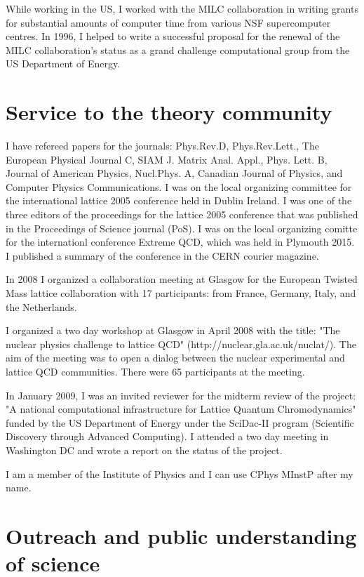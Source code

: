 \documentclass[12pt]{article}
\begin{document}
While working in the US,
I worked with the MILC collaboration in writing grants for
substantial amounts of computer time from various NSF supercomputer
centres. In 1996, I helped to write a successful proposal for the
renewal of the MILC collaboration's status as a grand challenge
computational group from the US Department of Energy. 


\section{Service to the theory community}

I have refereed papers for the journals: Phys.Rev.D, Phys.Rev.Lett.,
The European Physical Journal C, SIAM J. Matrix Anal. Appl.,
Phys. Lett. B, Journal of American Physics, Nucl.Phys. A, 
Canadian Journal of Physics,
and 
Computer Physics Communications.
I was on the local
organizing committee for the international lattice 2005 conference
held in Dublin Ireland. I was one of the three editors of the
proceedings for the lattice 2005 conference that was published in the
Proceedings of Science journal (PoS). I was on the local organizing
comitte for the internationl conference Extreme QCD, which was held
in Plymouth 2015. I published a summary of the conference in the CERN 
courier magazine.

In 2008 I organized a collaboration meeting at Glasgow for the
European Twisted Mass lattice collaboration with 17 participants: from
France, Germany, Italy, and the Netherlands.

I organized a two day workshop at Glasgow in April 2008 with the
title: "The nuclear physics challenge to lattice QCD"
(http://nuclear.gla.ac.uk/nuclat/). The aim of the meeting was to
open a dialog between the nuclear experimental and lattice
QCD communities. There were 65 participants at the meeting.

In January 2009, I was an invited reviewer for the midterm review of
the project: "A national computational infrastructure for Lattice
Quantum Chromodynamics" funded by the US Department of Energy 
under the SciDac-II program (Scientific Discovery 
through Advanced Computing).
I attended a two day meeting in Washington DC and wrote a report
on the status of the project.

I am a member of the Institute of Physics and I can use
CPhys MInstP after my name.

\section{Outreach and public understanding of science}
\end{document}
